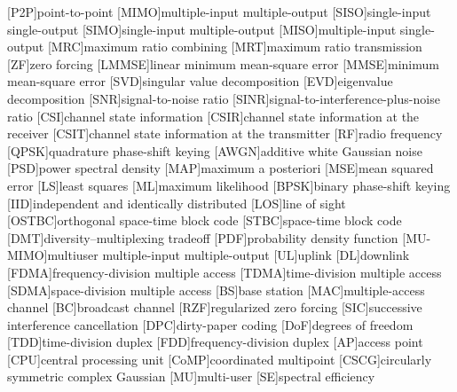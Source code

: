 \begin{acronym}
	[P2P]{point-to-point}
	[MIMO]{multiple-input multiple-output}
	[SISO]{single-input single-output}
	[SIMO]{single-input multiple-output}
	[MISO]{multiple-input single-output}
	[MRC]{maximum ratio combining}
	[MRT]{maximum ratio transmission}
	[ZF]{zero forcing}
	[LMMSE]{linear minimum mean-square error}
	[MMSE]{minimum mean-square error}
	[SVD]{singular value decomposition}
	[EVD]{eigenvalue decomposition}
	[SNR]{signal-to-noise ratio}
	[SINR]{signal-to-interference-plus-noise ratio}
	[CSI]{channel state information}
	[CSIR]{channel state information at the receiver}
	[CSIT]{channel state information at the transmitter}
	[RF]{radio frequency}
	[QPSK]{quadrature phase-shift keying}
	[AWGN]{additive white Gaussian noise}
	[PSD]{power spectral density}
	[MAP]{maximum a posteriori}
	[MSE]{mean squared error}
	[LS]{least squares}
	[ML]{maximum likelihood }
	[BPSK]{binary phase-shift keying}
	[IID]{independent and identically distributed}
	[LOS]{line of sight}
	[OSTBC]{orthogonal space-time block code}
	[STBC]{space-time block code}
	[DMT]{diversity--multiplexing tradeoff}
	[PDF]{probability density function}
	[MU-MIMO]{multiuser multiple-input multiple-output}
	[UL]{uplink}
	[DL]{downlink}
	[FDMA]{frequency-division multiple access}
	[TDMA]{time-division multiple access}
	[SDMA]{space-division multiple access}
	[BS]{base station}
	[MAC]{multiple-access channel}
	[BC]{broadcast channel}
	[RZF]{regularized zero forcing}
	[SIC]{successive interference cancellation}
	[DPC]{dirty-paper coding}
	[DoF]{degrees of freedom}
	[TDD]{time-division duplex}
	[FDD]{frequency-division duplex}
	[AP]{access point}
	[CPU]{central processing unit}
	[CoMP]{coordinated multipoint}
	[CSCG]{circularly symmetric complex Gaussian}
	[MU]{multi-user}
	[SE]{spectral efficiency}
\end{acronym}
